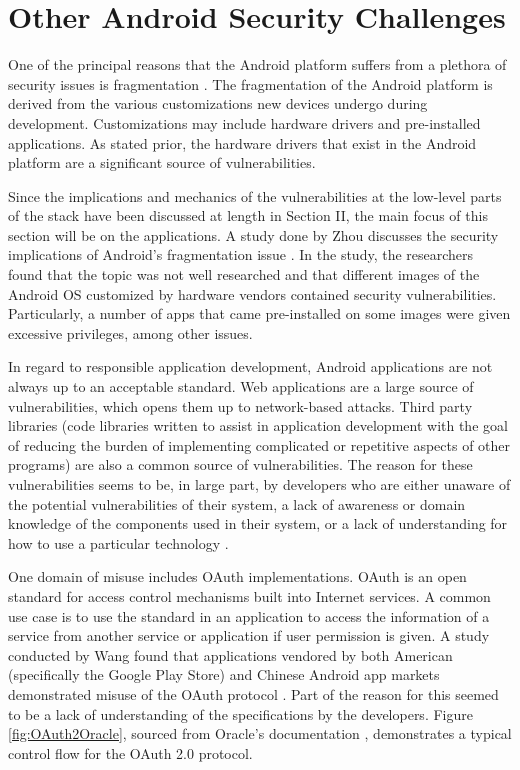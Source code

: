 \section{Other Android Security Challenges}
One of the principal reasons that the Android platform suffers from a plethora of security issues is fragmentation \cite{Zhou2014, Gilski2015, Faruki2015}.
The fragmentation of the Android platform is derived from the various customizations new devices undergo during development.
Customizations may include hardware drivers and pre-installed applications.
As stated prior, the hardware drivers that exist in the Android platform are a significant source of vulnerabilities.

Since the implications and mechanics of the vulnerabilities at the low-level parts of the stack have been discussed at length in Section II, the main focus of this section will be on the applications.
A study done by Zhou \etal discusses the security implications of Android's fragmentation issue \cite{Zhou2014}.
In the study, the researchers found that the topic was not well researched and that different images of the Android OS customized by hardware vendors contained security vulnerabilities.
Particularly, a number of apps that came pre-installed on some images were given excessive privileges, among other issues.

In regard to responsible application development, Android applications are not always up to an acceptable standard.
Web applications are a large source of vulnerabilities, which opens them up to network-based attacks.
Third party libraries (code libraries written to assist in application development with the goal of reducing the burden of implementing complicated or repetitive aspects of other programs) are also a common source of vulnerabilities.
The reason for these vulnerabilities seems to be, in large part, by developers who are either unaware of the potential vulnerabilities of their system, a lack of awareness or domain knowledge of the components used in their system, or a lack of understanding for how to use a particular technology \cite{Qin2020, Zhan2021}.

One domain of misuse includes OAuth implementations. OAuth is an open standard for access control mechanisms built into Internet services.
A common use case is to use the standard in an application to access the information of a service from another service or application if user permission is given.
A study conducted by Wang \etal found that applications vendored by both American (specifically the Google Play Store) and Chinese Android app markets demonstrated misuse of the OAuth protocol \cite{Wang2015}.
Part of the reason for this seemed to be a lack of understanding of the specifications by the developers.
Figure \ref{fig:OAuth2Oracle}, sourced from Oracle's documentation \cite{OAuth2ControlOracle}, demonstrates a typical control flow for the OAuth 2.0 protocol.

